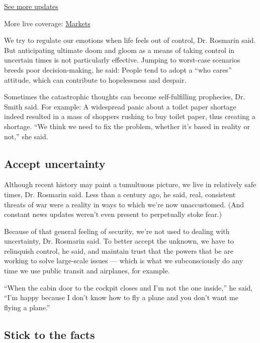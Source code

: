 \href{https://www.nytimes3xbfgragh.onion/2020/09/11/world/covid-19-coronavirus.html?action=click\&pgtype=Article\&state=default\&region=MAIN_CONTENT_1\&context=storylines_live_updates}{See
more updates}

More live coverage:
\href{https://www.nytimes3xbfgragh.onion/live/2020/09/11/business/stock-market-today-coronavirus?action=click\&pgtype=Article\&state=default\&region=MAIN_CONTENT_1\&context=storylines_live_updates}{Markets}

We try to regulate our emotions when life feels out of control, Dr.
Rosmarin said. But anticipating ultimate doom and gloom as a means of
taking control in uncertain times is not particularly effective. Jumping
to worst-case scenarios breeds poor decision-making, he said: People
tend to adopt a ``who cares'' attitude, which can contribute to
hopelessness and despair.

Sometimes the catastrophic thoughts can become self-fulfilling
prophecies, Dr. Smith said. For example: A widespread panic about a
toilet paper shortage indeed resulted in a mass of shoppers rushing to
buy toilet paper, thus creating a shortage. ``We think we need to fix
the problem, whether it's based in reality or not,'' she said.

\hypertarget{accept-uncertainty}{%
\subsection{Accept uncertainty}\label{accept-uncertainty}}

Although recent history may paint a tumultuous picture, we live in
relatively safe times, Dr. Rosmarin said. Less than a century ago, he
said, real, consistent threats of war were a reality in ways to which
we're now unaccustomed. (And constant news updates weren't even present
to perpetually stoke fear.)

Because of that general feeling of security, we're not used to dealing
with uncertainty, Dr. Rosmarin said. To better accept the unknown, we
have to relinquish control, he said, and maintain trust that the powers
that be are working to solve large-scale issues --- which is what we
subconsciously do any time we use public transit and airplanes, for
example.

``When the cabin door to the cockpit closes and I'm not the one
inside,'' he said, ``I'm happy because I don't know how to fly a plane
and you don't want me flying a plane.''

\hypertarget{stick-to-the-facts}{%
\subsection{Stick to the facts}\label{stick-to-the-facts}}

